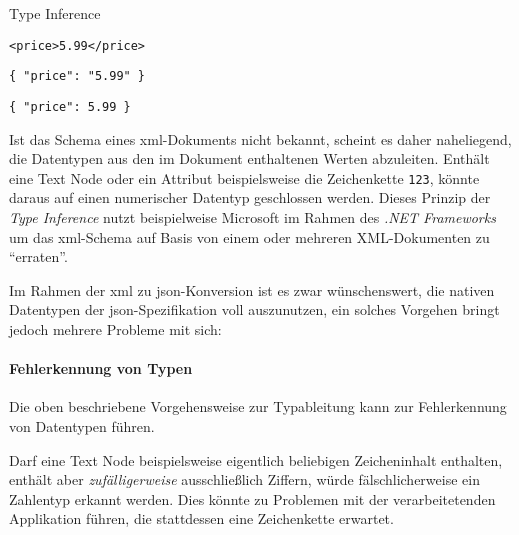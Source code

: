 \begin{example} Type Inference
    \begin{verbatim}
<price>5.99</price>
    \end{verbatim}
    \label{fig:typeinferxml}

    \begin{verbatim}
{ "price": "5.99" }
    \end{verbatim}
    \label{fig:typeinferjson1}

    \begin{verbatim}
{ "price": 5.99 }
    \end{verbatim}
    \label{fig:typeinferjson2}

\end{example}

Ist das Schema eines \acrshort{xml}-Dokuments nicht bekannt, scheint es daher naheliegend, die Datentypen aus den im Dokument enthaltenen Werten abzuleiten. Enthält eine Text Node oder ein Attribut beispielsweise die Zeichenkette \texttt{123}, könnte daraus auf einen numerischer Datentyp geschlossen werden. Dieses Prinzip der \emph{Type Inference} nutzt beispielweise Microsoft im Rahmen des \emph{.NET Frameworks} um das \acrshort{xml}-Schema auf Basis von einem oder mehreren XML-Dokumenten zu \enquote{erraten}.\cite{msdn2017inferxmlschema}

Im Rahmen der \acrshort{xml} zu \acrshort{json}-Konversion ist es zwar wünschenswert, die nativen Datentypen der \acrshort{json}-Spezifikation voll auszunutzen, ein solches Vorgehen bringt jedoch mehrere Probleme mit sich:

\paragraph{Fehlerkennung von Typen}

Die oben beschriebene Vorgehensweise zur Typableitung kann zur Fehlerkennung von Datentypen führen.

Darf eine Text Node beispielsweise eigentlich beliebigen Zeicheninhalt enthalten, enthält aber \emph{zufälligerweise} ausschließlich Ziffern, würde fälschlicherweise ein Zahlentyp erkannt werden. Dies könnte zu Problemen mit der verarbeitetenden Applikation führen, die stattdessen eine Zeichenkette erwartet.

